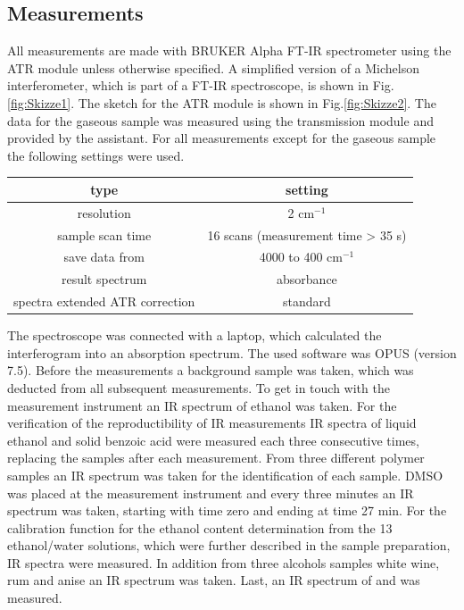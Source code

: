 \documentclass[a4paper,abstracton]{article}	                       %
\begin{document}
\subsection*{Measurements}
All measurements are made with BRUKER Alpha FT-IR spectrometer using the ATR module unless otherwise specified. A simplified version of a Michelson interferometer, which is part of a FT-IR spectroscope, is shown in Fig.\ref{fig:Skizze1}. The sketch for the ATR module is shown in Fig.\ref{fig:Skizze2}. The data for the gaseous  sample was measured using the transmission module and provided by the assistant. For all measurements except for the gaseous  sample the following settings were used.

\begin{table}[H]
\centering
\begin{tabular}{c|c}
    type & setting \\
     \hline
    resolution & 2 cm$^{-1}$\\
    sample scan time & 16 scans (measurement time > 35 \si{s})\\
    save data from & 4000 to 400 cm$^{-1}$\\
    result spectrum & absorbance\\
    spectra extended ATR correction & standard 
\end{tabular}
\end{table}

The spectroscope was connected with a laptop, which calculated the interferogram into an absorption spectrum. The used software was OPUS (version 7.5). Before the measurements a background sample was taken, which was deducted from all subsequent measurements. 
To get in touch with the measurement instrument an IR spectrum of ethanol was taken. 
For the verification of the reproductibility of IR measurements IR spectra of liquid ethanol and solid benzoic acid were measured each three consecutive times, replacing the samples after each measurement. From three different polymer samples an IR spectrum was taken for the identification of each sample. DMSO was placed at the measurement instrument and every three minutes an IR spectrum was taken, starting with time zero and ending at time 27 min. For the calibration function for the ethanol content determination from the 13 ethanol/water solutions, which were further described in the sample preparation, IR spectra were measured. In addition from three alcohols samples white wine, rum and anise an IR spectrum was taken. Last, an IR spectrum of  and  was measured. 
\end{document}

